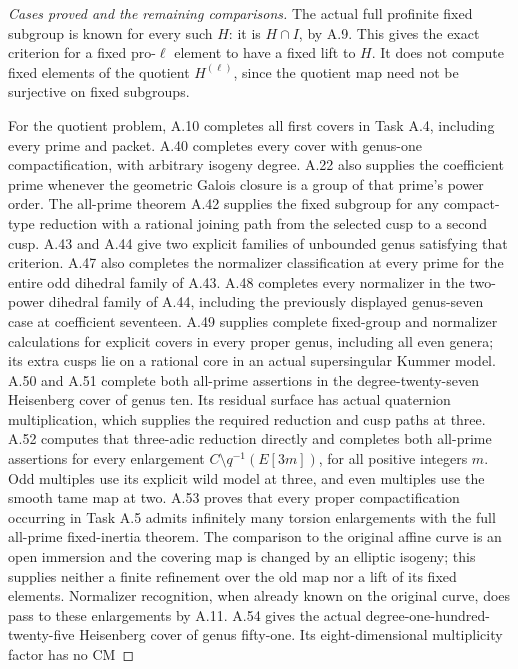 \begin{proof}[Cases proved and the remaining comparisons]
The actual full profinite fixed subgroup is known for every such
\(H\): it is \(H\cap I\), by A.9. This gives the exact
criterion for a fixed pro-\(\ell\) element to have a fixed lift
to \(H\). It does not compute fixed elements of the quotient
\(H^{(\ell)}\), since the quotient map need not be surjective
on fixed subgroups.

For the quotient problem, A.10 completes all first covers in
Task A.4, including every prime and packet. A.40 completes every
cover with genus-one compactification, with arbitrary isogeny
degree. A.22 also supplies the coefficient prime whenever the
geometric Galois closure is a group of that prime's power order.
The all-prime theorem A.42 supplies the fixed subgroup for any
compact-type reduction with a rational joining path from the
selected cusp to a second cusp. A.43 and A.44 give two explicit
families of unbounded genus satisfying that criterion. A.47 also
completes the normalizer classification at every prime for the
entire odd dihedral family of A.43. A.48 completes every
normalizer in the two-power dihedral family of A.44, including
the previously displayed genus-seven case at coefficient seventeen.
A.49 supplies complete fixed-group and normalizer calculations
for explicit covers in every proper genus, including all even genera;
its extra cusps lie on a rational core in an actual supersingular
Kummer model.
A.50 and A.51 complete both all-prime assertions in the
degree-twenty-seven Heisenberg cover of genus ten. Its residual
surface has actual quaternion multiplication, which supplies
the required reduction and cusp paths at three.
A.52 computes that three-adic reduction directly and completes both
all-prime assertions for every enlargement
\(C\setminus q^{-1}(E[3m])\), for all positive integers \(m\).
Odd multiples use its explicit wild model at three, and even
multiples use the smooth tame map at two.
A.53 proves that every proper compactification occurring in Task A.5
admits infinitely many torsion enlargements with the full all-prime
fixed-inertia theorem. The comparison to the original affine curve is
an open immersion and the covering map is changed by an elliptic
isogeny; this supplies neither a finite refinement over the old map
nor a lift of its fixed elements. Normalizer recognition, when already
known on the original curve, does pass to these enlargements by A.11.
A.54 gives the actual degree-one-hundred-twenty-five Heisenberg cover
of genus fifty-one. Its eight-dimensional multiplicity factor has no CM

\end{proof}
